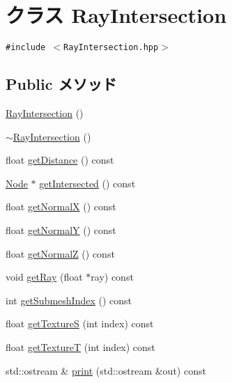 \hypertarget{classm3g_1_1RayIntersection}{
\section{クラス RayIntersection}
\label{classm3g_1_1RayIntersection}
}
{\tt \#include $<$RayIntersection.hpp$>$}

\subsection*{Public メソッド}
\begin{CompactItemize}
\item 
\hyperlink{classm3g_1_1RayIntersection_242b33a79f98ed90ad5a36912d2a46d5}{RayIntersection} ()
\item 
\hyperlink{classm3g_1_1RayIntersection_bf9eb45cc9ff31acd542bb0da1b46fe1}{$\sim$RayIntersection} ()
\item 
float \hyperlink{classm3g_1_1RayIntersection_f024301f51d2ef67cac50e3255a49612}{getDistance} () const 
\item 
\hyperlink{classm3g_1_1Node}{Node} $\ast$ \hyperlink{classm3g_1_1RayIntersection_cbf90cea6001c33cc03b5a737b312f62}{getIntersected} () const 
\item 
float \hyperlink{classm3g_1_1RayIntersection_0ee7a8fab5e001b131bd3109da8af7fa}{getNormalX} () const 
\item 
float \hyperlink{classm3g_1_1RayIntersection_1e05e3b3e8d6b46462812e4713a63d18}{getNormalY} () const 
\item 
float \hyperlink{classm3g_1_1RayIntersection_5d0569741397401f53b776f16d08f5c3}{getNormalZ} () const 
\item 
void \hyperlink{classm3g_1_1RayIntersection_3f4d1f2f24c0dadab914014836e1b138}{getRay} (float $\ast$ray) const 
\item 
int \hyperlink{classm3g_1_1RayIntersection_6a11c61d1a1fecc01f2f83463404a6b8}{getSubmeshIndex} () const 
\item 
float \hyperlink{classm3g_1_1RayIntersection_bc14e1d5a83d5fca608b1fbf772614d4}{getTextureS} (int index) const 
\item 
float \hyperlink{classm3g_1_1RayIntersection_843d5b907bb54a6f28571f0a0f14c932}{getTextureT} (int index) const 
\item 
std::ostream \& \hyperlink{classm3g_1_1RayIntersection_d6bd96bbcbdd53ede8e72f8f13c0da48}{print} (std::ostream \&out) const 
\end{CompactItemize}


